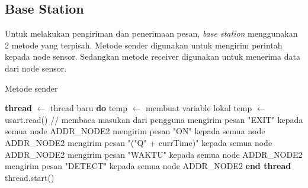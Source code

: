 \subsection{Base Station}
Untuk melakukan pengiriman dan penerimaan pesan, \textit{base station} menggunakan 2 metode yang terpisah. Metode sender digunakan untuk mengirim perintah kepada node sensor. Sedangkan metode receiver digunakan untuk menerima data dari node sensor.
\begin{algorithm}[htbp]
\caption{Metode sender}
\begin{algorithmic}[1]
    \State \textbf{thread} $\leftarrow$ thread baru \textbf{do}
        \Indent
                    \State temp $\leftarrow$ membuat variable lokal
                        \try
                            \State temp $\leftarrow$ usart.read() // membaca masukan dari pengguna
                        \endtry
                            \State mengirim pesan "EXIT" kepada semua node ADDR\_NODE2
                            \State mengirim pesan "ON" kepada semua node ADDR\_NODE2
                            \State mengirim pesan "("Q" + currTime)" kepada semua node ADDR\_NODE2
                            \State mengirim pesan "WAKTU" kepada semua node ADDR\_NODE2
                            \State mengirim pesan "DETECT" kepada semua node ADDR\_NODE2
                        \EndIf
                \EndWhile
            \EndFunction
        \EndIndent
    \State \textbf{end thread}
    \State thread.start()
\EndFunction
\end{algorithmic}
\end{algorithm}

